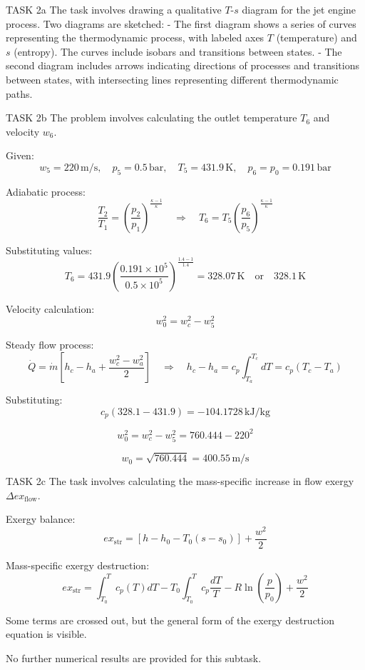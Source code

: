 TASK 2a  
The task involves drawing a qualitative \( T \)-\( s \) diagram for the jet engine process. Two diagrams are sketched:  
- The first diagram shows a series of curves representing the thermodynamic process, with labeled axes \( T \) (temperature) and \( s \) (entropy). The curves include isobars and transitions between states.  
- The second diagram includes arrows indicating directions of processes and transitions between states, with intersecting lines representing different thermodynamic paths.  

TASK 2b  
The problem involves calculating the outlet temperature \( T_6 \) and velocity \( w_6 \).  

Given:  
\[
w_5 = 220 \, \text{m/s}, \quad p_5 = 0.5 \, \text{bar}, \quad T_5 = 431.9 \, \text{K}, \quad p_6 = p_0 = 0.191 \, \text{bar}
\]  

Adiabatic process:  
\[
\frac{T_2}{T_1} = \left( \frac{p_2}{p_1} \right)^{\frac{\kappa-1}{\kappa}} \quad \Rightarrow \quad T_6 = T_5 \left( \frac{p_6}{p_5} \right)^{\frac{\kappa-1}{\kappa}}
\]  

Substituting values:  
\[
T_6 = 431.9 \left( \frac{0.191 \times 10^5}{0.5 \times 10^5} \right)^{\frac{1.4-1}{1.4}} = 328.07 \, \text{K} \quad \text{or} \quad 328.1 \, \text{K}
\]  

Velocity calculation:  
\[
w_0^2 = w_c^2 - w_5^2
\]  

Steady flow process:  
\[
\dot{Q} = \dot{m} \left[ h_c - h_a + \frac{w_c^2 - w_a^2}{2} \right] \quad \Rightarrow \quad h_c - h_a = c_p \int_{T_a}^{T_c} dT = c_p (T_c - T_a)
\]  

Substituting:  
\[
c_p (328.1 - 431.9) = -104.1728 \, \text{kJ/kg}
\]  

\[
w_0^2 = w_c^2 - w_5^2 = 760.444 - 220^2
\]  

\[
w_0 = \sqrt{760.444} = 400.55 \, \text{m/s}
\]  

TASK 2c  
The task involves calculating the mass-specific increase in flow exergy \( \Delta ex_{\text{flow}} \).  

Exergy balance:  
\[
ex_{\text{str}} = \left[ h - h_0 - T_0 (s - s_0) \right] + \frac{w^2}{2}
\]  

Mass-specific exergy destruction:  
\[
ex_{\text{str}} = \int_{T_0}^{T} c_p (T) dT - T_0 \int_{T_0}^{T} c_p \frac{dT}{T} - R \ln \left( \frac{p}{p_0} \right) + \frac{w^2}{2}
\]  

Some terms are crossed out, but the general form of the exergy destruction equation is visible.  

No further numerical results are provided for this subtask.